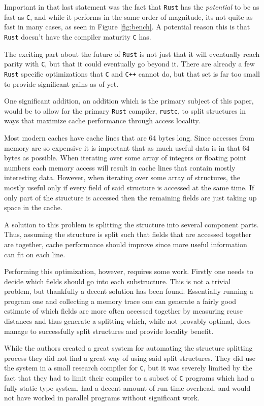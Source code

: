 \documentclass[12pt,oneside]{book}
\newcommand{\rustname}{{\texttt{Rust}}}
\def \rust {\rustname{}\xspace}
\newcommand{\rustcname}{{\texttt{rustc}}}
\def \rustc {\rustcname{}\xspace}
\newcommand{\cname}{{\texttt{C}}}
\def \c {\cname{}\xspace}
\newcommand{\cppname}{{\texttt{C++}}}
\def \cpp {\cppname{}\xspace}
\begin{document}
Important in that last statement was the fact that \rust has the 
\textit{potential}
to be as fast as \c, and while it performs in the same order of magnitude, its not
quite as fast in many cases, as seen in Figure \ref{fig:bench}.
A potential reason this is that \rust doesn't have the compiler maturity \c has.

The exciting part about the future of \rust is not just that it will eventually
reach parity with \c, but that it could eventually go beyond it. There are
already a few \rust specific optimizations that \c and \cpp cannot do, but that
set is far too small to provide significant gains as of yet.

One significant addition, an addition which is the primary subject of this
paper, would be to allow for the primary \rust compiler, \rustc, to split
structures in ways that maximize cache performance through access locality.

Most modern caches have cache lines that are 64 bytes long. Since accesses from
memory are so expensive it is important that as much useful data is in that 64
bytes as possible. When iterating over some array of integers or floating point
numbers each memory access will result in cache lines that contain mostly
interesting data. However, when iterating over some array of structures,
the mostly useful only
if every field of said structure is accessed at the same time. If only part of
the structure is accessed then the remaining fields are just taking up space in
the cache.

A solution to this problem is splitting the structure into several component
parts. Thus, assuming the structure is split such that fields that are accessed
together are together, cache performance should improve since more useful 
information can fit on each line.

Performing this optimization, however, requires some work. Firstly one
needs to decide which fields should go into
each substructure. This is not a trivial problem, but thankfully a decent
solution has been found\cite{Zhong:2004:ARS:996893.996872}.
Essentially running a program one and collecting
a memory trace one can generate a fairly good estimate of which fields are more
often accessed together by measuring reuse distances and 
thus generate a splitting which, while not provably optimal, 
does manage to successfully split structures and
provide locality benefit.

While the authors created a great system for automating the structure splitting 
process they did not find a great way of using said split structures. They did
use the system in a small research compiler for \c, but it was severely limited
by the fact that they had to limit their compiler to a subset of \c programs
which had a fully static type system, had a decent amount of run time overhead, 
and would not have worked in parallel programs without significant work.
\end{document}
